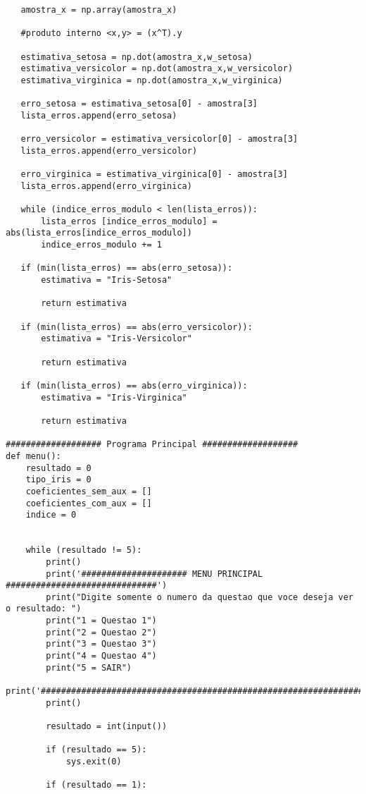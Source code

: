 \documentclass[a4paper,12pt,twoside]{article}
\begin{document}
\begin{lstlisting}
   amostra_x = np.array(amostra_x)
   
   #produto interno <x,y> = (x^T).y
   
   estimativa_setosa = np.dot(amostra_x,w_setosa)
   estimativa_versicolor = np.dot(amostra_x,w_versicolor)
   estimativa_virginica = np.dot(amostra_x,w_virginica)
   
   erro_setosa = estimativa_setosa[0] - amostra[3]
   lista_erros.append(erro_setosa)
   
   erro_versicolor = estimativa_versicolor[0] - amostra[3]
   lista_erros.append(erro_versicolor)
   
   erro_virginica = estimativa_virginica[0] - amostra[3]
   lista_erros.append(erro_virginica)
   
   while (indice_erros_modulo < len(lista_erros)):
       lista_erros [indice_erros_modulo] = abs(lista_erros[indice_erros_modulo])
       indice_erros_modulo += 1
   
   if (min(lista_erros) == abs(erro_setosa)):
       estimativa = "Iris-Setosa"
       
       return estimativa
   
   if (min(lista_erros) == abs(erro_versicolor)):
       estimativa = "Iris-Versicolor"
       
       return estimativa
   
   if (min(lista_erros) == abs(erro_virginica)):
       estimativa = "Iris-Virginica"
       
       return estimativa
    
################### Programa Principal ###################
def menu():
    resultado = 0
    tipo_iris = 0
    coeficientes_sem_aux = []
    coeficientes_com_aux = []
    indice = 0
    
    
    while (resultado != 5):    
        print()
        print('##################### MENU PRINCIPAL ##############################')
        print("Digite somente o numero da questao que voce deseja ver o resultado: ")
        print("1 = Questao 1")
        print("2 = Questao 2")
        print("3 = Questao 3")
        print("4 = Questao 4")
        print("5 = SAIR")
        print('###################################################################')
        print()
        
        resultado = int(input())
        
        if (resultado == 5):
            sys.exit(0)
    
        if (resultado == 1):
            

\end{lstlisting}
\end{document}
